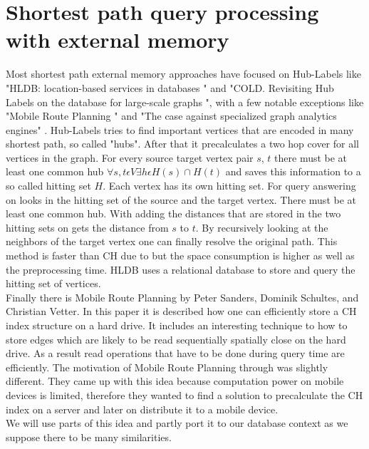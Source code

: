 \section{Shortest path query processing with external memory}\label{sec:external_memory}

Most shortest path external memory approaches have focused on Hub-Labels like "HLDB: location-based services in databases \cite{Abraham_2012}" and "COLD. Revisiting Hub Labels on the database for large-scale graphs \cite{efentakis2015cold}", with a few notable exceptions like "Mobile Route Planning \cite{Sanders}" and "The case against specialized graph analytics engines" \cite{fan2015case}.
Hub-Labels tries to find important vertices that are encoded in many shortest path, so called "hubs". 
After that it precalculates a two hop cover for all vertices in the graph.
For every source target vertex pair $s$, $t$ there must be at least one common hub $\forall s,t \epsilon V \exists h \epsilon H(s) \cap H(t)$ \cite{Abraham_2011} and saves this information to a so called hitting set $H$. 
Each vertex has its own hitting set. 
For query answering on looks in the hitting set of the source and the target vertex. 
There must be at least one common hub.
With adding the distances that are stored in the two hitting sets on gets the distance from $s$ to $t$.
By recursively looking at the neighbors of the target vertex one can finally resolve the original path. 
This method is faster than CH due to \cite{Abraham_2012} but the space consumption is higher as well as the preprocessing time. 
HLDB \cite{Abraham_2012} uses a relational database to store and query the hitting set of vertices.
\\
Finally there is Mobile Route Planning \cite{Sanders} by Peter Sanders, Dominik Schultes, and Christian Vetter.
In this paper it is described how one can efficiently store a CH index structure on a hard drive.
It includes an interesting technique to how to store edges which are likely to be read sequentially spatially close on the hard drive.
As a result read operations that have to be done during query time are efficiently.
The motivation of Mobile Route Planning \cite{Sanders} through was slightly different.
They came up with this idea because computation power on mobile devices is limited, therefore they wanted to find a solution to precalculate the CH index on a server and later on distribute it to a mobile device.
\\
We will use parts of this idea and partly port it to our database context as we suppose there to be many similarities.


